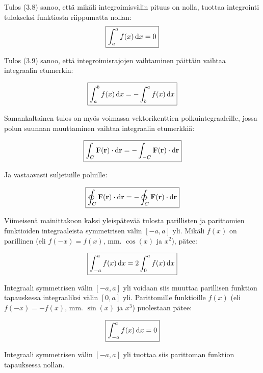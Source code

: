 \documentclass[../integrointiopas.tex]{subfiles}
\begin{document}
	Tulos (3.8) sanoo, että mikäli integroimisvälin pituus on nolla, tuottaa integrointi tulokseksi funktiosta riippumatta nollan: 
	\begin{equation}
		\boxed{\int_{a}^{a}f(x)\odif{x} = 0}
	\end{equation}
	
	Tulos (3.9) sanoo, että integroimisrajojen vaihtaminen päittäin vaihtaa integraalin etumerkin:
	
	\begin{equation}
		\boxed{\int_{a}^{b}f(x)\odif{x} = -\int_{b}^{a}f(x)\odif{x}}
	\end{equation}
	
	Samankaltainen tulos on myös voimassa vektorikenttien polkuintegraaleille, jossa polun suunnan muuttaminen vaihtaa integraalin etumerkkiä:
	
	\begin{equation}
		\boxed{\int_{C}\vtr{F}(\vtr{r})\cdot\odif{\vtr{r}} = -\int_{-C}\vtr{F}(\vtr{r})\cdot\odif{\vtr{r}}}
	\end{equation}
	
	Ja vastaavasti suljetuille poluille:
	
	\begin{equation}
		\boxed{\ointclockwise_{C}\vtr{F}(\vtr{r})\cdot\odif{\vtr{r}} = -\ointctrclockwise_{C}\vtr{F}(\vtr{r})\cdot\odif{\vtr{r}}}
	\end{equation}
	
	Viimeisenä mainittakoon kaksi yleispätevää tulosta parillisten ja parittomien funktioiden integraaleista symmetrisen välin $[-a, a]$ yli. Mikäli $f(x)$ on parillinen (eli $f(-x) = f(x)$, mm. $\cos(x)$ ja $x^2$), pätee:
	
	\begin{equation}
		\boxed{\int_{-a}^{a}f(x)\odif{x} = 2\int_{0}^{a}f(x)\odif{x}}
	\end{equation}
	
	Integraali symmetrisen välin $[-a, a]$ yli voidaan siis muuttaa parillisen funktion tapauskessa integraaliksi välin $[0, a]$ yli. Parittomille funktioille $f(x)$ (eli $f(-x) = -f(x)$, mm. $\sin(x)$ ja $x^3$) puolestaan pätee:
	
	\begin{equation}
		\boxed{\int_{-a}^{a}f(x)\odif{x} = 0}
	\end{equation}
	
	Integraali symmetrisen välin $[-a, a]$ yli tuottaa siis parittoman funktion tapauksessa nollan.
\end{document}
